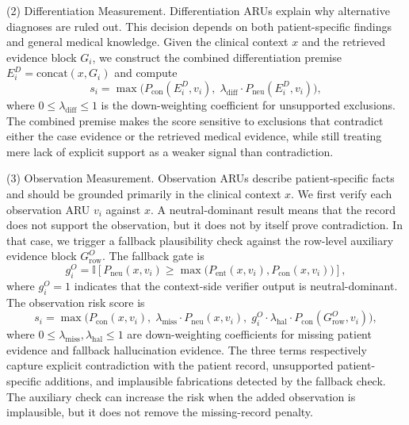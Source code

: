\documentclass[a4paper,fleqn,doubleblind]{cas-sc}
\begin{document}
(2) Differentiation Measurement.
Differentiation ARUs explain why alternative diagnoses are ruled out. This decision depends on both patient-specific findings and general medical knowledge. Given the clinical context $x$ and the retrieved evidence block $G_i$, we construct the combined differentiation premise $E_i^{D}=\mathrm{concat}(x,G_i)$ and compute
\begin{equation}
\label{eq:diff_score}
    s_i = \max \Big( P_{\text{con}}(E_i^{D}, v_i),\; \lambda_{\text{diff}} \cdot P_{\text{neu}}(E_i^{D}, v_i) \Big),
\end{equation}
where $0 \le \lambda_{\text{diff}} \le 1$ is the down-weighting coefficient for unsupported exclusions. The combined premise makes the score sensitive to exclusions that contradict either the case evidence or the retrieved medical evidence, while still treating mere lack of explicit support as a weaker signal than contradiction.

(3) Observation Measurement.
Observation ARUs describe patient-specific facts and should be grounded primarily in the clinical context $x$. We first verify each observation ARU $v_i$ against $x$. A neutral-dominant result means that the record does not support the observation, but it does not by itself prove contradiction. In that case, we trigger a fallback plausibility check against the row-level auxiliary evidence block $G_{\text{row}}^{O}$. The fallback gate is
\[
g_i^{O} = \mathbb{I}\!\left[P_{\text{neu}}(x, v_i) \ge \max\!\big(P_{\text{ent}}(x, v_i), P_{\text{con}}(x, v_i)\big)\right],
\]
where $g_i^{O}=1$ indicates that the context-side verifier output is neutral-dominant. The observation risk score is
\begin{equation}
\label{eq:record_score}
    s_i = \max \Big( P_{\text{con}}(x, v_i),\; \lambda_{\text{miss}} \cdot P_{\text{neu}}(x, v_i),\; g_i^{O} \cdot \lambda_{\text{hal}} \cdot P_{\text{con}}(G_{\text{row}}^{O}, v_i) \Big),
\end{equation}
where $0 \le \lambda_{\text{miss}}, \lambda_{\text{hal}} \le 1$ are down-weighting coefficients for missing patient evidence and fallback hallucination evidence. The three terms respectively capture explicit contradiction with the patient record, unsupported patient-specific additions, and implausible fabrications detected by the fallback check. The auxiliary check can increase the risk when the added observation is implausible, but it does not remove the missing-record penalty.
\end{document}
